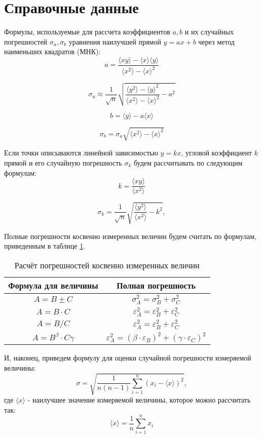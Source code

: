 \section{Справочные данные}

Формулы, используемые для рассчета коэффициентов $a, b$ и их случайных погрешностей $\sigma_a, \sigma_b$ уравнения наилучшей прямой $y = ax+ b$ через метод наименьших квадратов (МНК):
$$
    a = \frac{\langle xy \rangle - \langle x \rangle \langle y \rangle}{\langle x^2 \rangle - \langle x \rangle ^2}
$$

$$
    \sigma_a \approx \frac{1}{\sqrt{n}} \sqrt{\frac{\langle y^2 \rangle - \langle y \rangle^2}{\langle x^2 \rangle - \langle x \rangle^2} - a^2}
$$

$$
    b = \langle y \rangle - a \langle x \rangle
$$

$$
    \sigma_b = \sigma_a \sqrt{\langle x^2 \rangle - \langle x \rangle^2}
$$

Если точки описываются линейной зависимостью $y = kx$, угловой коэффициент $k$ прямой и его случайную погрешность $\sigma_k$ будем рассчитывать по следующим формулам:
$$
    k = \frac{\langle xy \rangle}{\langle x^2 \rangle}
$$

$$
    \sigma_k = \frac{1}{\sqrt{n}} \sqrt{\frac{\langle y^2 \rangle}{\langle x^2 \rangle} - k^2},
$$

Полные погрешности косвенно измеренных величин будем считать по формулам, приведенным в таблице \ref{pog}.

\begin{table}[h!]
\centering
\caption{Расчёт погрешностей косвенно измеренных величин}
\label{pog}
\begin{tabular}{|c|c|}
\hline
\multicolumn{1}{|c|}{Формула для величины} & Полная погрешность \\ \hline
                    $A = B \pm C$          & $\sigma_A^2 = \sigma_B^2 + \sigma_C^2 $                  \\ \hline
                    $A = B \cdot C$        & $\varepsilon_A^2 = \varepsilon_B^2 + \varepsilon_C^2 $   \\ \hline
                    $A = B / C$            & $\varepsilon_A^2 = \varepsilon_B^2 + \varepsilon_C^2 $   \\ \hline
                    $A = B^\beta \cdot C\gamma$        & $\varepsilon_A^2 = (\beta \cdot \varepsilon_B)^2 + (\gamma \cdot \varepsilon_C)^2 $   \\ \hline
\end{tabular}
\end{table}

И, наконец, приведем формулу для оценки случайной погрешности измеряемой величины:
$$
    \sigma = \sqrt{\frac{1}{n(n-1)} \sum \limits_{i = 1}^{n} (x_i - \langle x \rangle)^2},
$$
где $\langle x \rangle$ - наилучшее значение измеряемой величины, которое можно рассчитать так:
$$
    \langle x \rangle = \frac{1}{n} \sum \limits_{i = 1}^{n} x_i
$$




